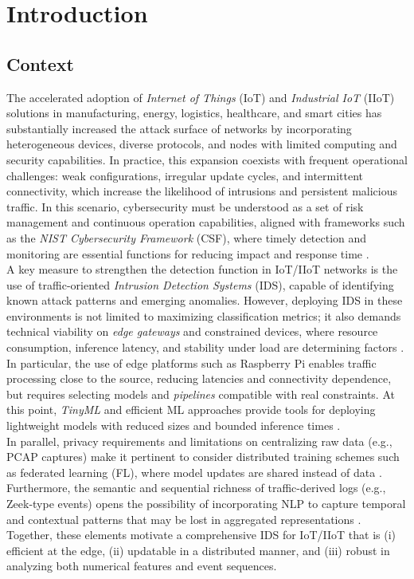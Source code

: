 \chapter{Introduction}
\label{chap:Introduction}

\section{Context}

The accelerated adoption of \textit{Internet of Things} (IoT) and \textit{Industrial IoT} (IIoT) solutions in manufacturing, energy, logistics, healthcare, and smart cities has substantially increased the attack surface of networks by incorporating heterogeneous devices, diverse protocols, and nodes with limited computing and security capabilities. In practice, this expansion coexists with frequent operational challenges: weak configurations, irregular update cycles, and intermittent connectivity, which increase the likelihood of intrusions and persistent malicious traffic. In this scenario, cybersecurity must be understood as a set of risk management and continuous operation capabilities, aligned with frameworks such as the \textit{NIST Cybersecurity Framework} (CSF), where timely detection and monitoring are essential functions for reducing impact and response time \cite{NIST_CSF2_2024}.\\
\newline
A key measure to strengthen the detection function in IoT/IIoT networks is the use of traffic-oriented \textit{Intrusion Detection Systems} (IDS), capable of identifying known attack patterns and emerging anomalies. However, deploying IDS in these environments is not limited to maximizing classification metrics; it also demands technical viability on \textit{edge gateways} and constrained devices, where resource consumption, inference latency, and stability under load are determining factors \cite{Tekin2023_OnDeviceEnergy}. In particular, the use of edge platforms such as Raspberry Pi enables traffic processing close to the source, reducing latencies and connectivity dependence, but requires selecting models and \textit{pipelines} compatible with real constraints. At this point, \textit{TinyML} and efficient ML approaches provide tools for deploying lightweight models with reduced sizes and bounded inference times \cite{DuttaBharali2021_TinyMLSurvey}.\\
\newline
In parallel, privacy requirements and limitations on centralizing raw data (e.g., PCAP captures) make it pertinent to consider distributed training schemes such as federated learning (FL), where model updates are shared instead of data \cite{Imteaj2022_FL_ResourceConstrainedSurvey}. Furthermore, the semantic and sequential richness of traffic-derived logs (e.g., Zeek-type events) opens the possibility of incorporating NLP to capture temporal and contextual patterns that may be lost in aggregated representations \cite{Yadav2023_LLM_Zeek, LogBERT2021}. Together, these elements motivate a comprehensive IDS for IoT/IIoT that is (i) efficient at the edge, (ii) updatable in a distributed manner, and (iii) robust in analyzing both numerical features and event sequences.

